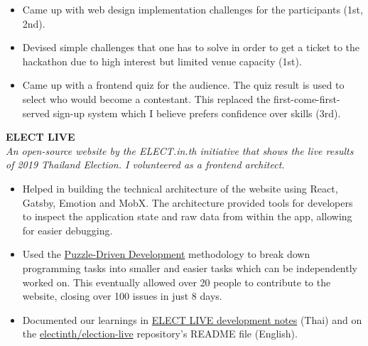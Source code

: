 \documentclass[a4paper]{article}
\newcommand{\github} [1] {\href{https://github.com/#1}{#1}}
\begin{document}
\begin{itemize} \itemsep 1pt
    
	\item Came up with web design implementation challenges for the participants (1st, 2nd).
    
	\item Devised simple challenges that one has to solve in order to get a ticket to the hackathon due to high interest but limited venue capacity (1st).
    
	\item Came up with a frontend quiz for the audience. The quiz result is used to select who would become a contestant. This replaced the first-come-first-served sign-up system which I believe prefers confidence over skills (3rd).
    
\end{itemize}

\vspace{2mm}

\textbf{ELECT LIVE}\\
\textit{An open-source website by the ELECT.in.th initiative that shows the live results of 2019 Thailand Election. I volunteered as a frontend architect.}

\begin{itemize} \itemsep 1pt
    
	\item Helped in building the technical architecture of the website using React, Gatsby, Emotion and MobX. The architecture provided tools for developers to inspect the application state and raw data from within the app, allowing for easier debugging.
    
	\item Used the \href{https://www.yegor256.com/2010/03/04/pdd.html}{Puzzle-Driven Development} methodology to break down programming tasks into smaller and easier tasks which can be independently worked on. This eventually allowed over 20 people to contribute to the website, closing over 100 issues in just 8 days.
    
	\item Documented our learnings in \href{https://wonderful.software/elect-live/}{ELECT LIVE development notes} (Thai) and on the \github{electinth/election-live} repository’s README file (English).
    
\end{itemize}

\vspace{2mm}
\end{document}
